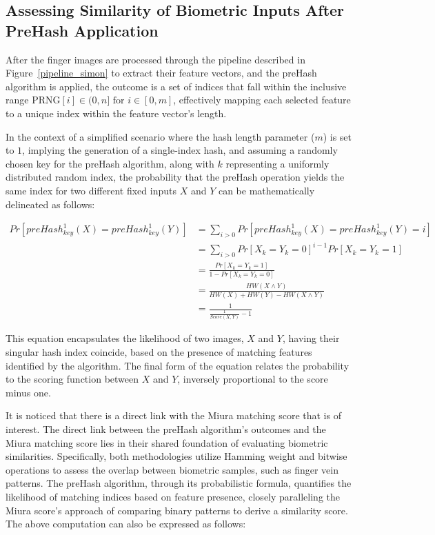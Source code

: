 \subsection{Assessing Similarity of Biometric Inputs After PreHash Application}
\label{sec:mu}

After the finger images are processed through the pipeline described in Figure~\ref{pipeline_simon} to extract their feature vectors, and the preHash algorithm is applied, the outcome is a set of indices that fall within the inclusive range \(\text{PRNG}[i] \in (0, n] \text{ for } i \in [0, m]\), effectively mapping each selected feature to a unique index within the feature vector's length.

In the context of a simplified scenario where the hash length parameter (\(m\)) is set to \(1\), implying the generation of a single-index hash, and assuming a randomly chosen key for the preHash algorithm, along with \(k\) representing a uniformly distributed random index, the probability that the preHash operation yields the same index for two different fixed inputs \(X\) and \(Y\) can be mathematically delineated as follows:


\begin{equation} \label{eq:preHash1}
    \begin{aligned}
        Pr[preHash_{key}^1(X) = preHash_{key}^1(Y)] &= \sum_{i > 0} Pr[preHash_{key}^1(X) = preHash_{key}^1(Y) = i]\\
        &= \sum_{i > 0} Pr[X_k = Y_k = 0]^{i - 1} Pr[X_k = Y_k = 1]\\
        &= \frac{Pr[X_k = Y_k = 1]}{1 - Pr[X_k = Y_k = 0]}\\
        &= \frac{HW(X \land Y)}{HW(X) + HW(Y) - HW(X \land Y)}\\
        &= \frac{1}{\frac{1}{Score(X, Y)} - 1}
    \end{aligned}
\end{equation}

This equation encapsulates the likelihood of two images, \(X\) and \(Y\), having their singular hash index coincide, based on the presence of matching features identified by the algorithm. The final form of the equation relates the probability to the scoring function between \(X\) and \(Y\), inversely proportional to the score minus one.

It is noticed that there is a direct link with the Miura matching score that is of interest. The direct link between the preHash algorithm's outcomes and the Miura matching score lies in their shared foundation of evaluating biometric similarities. Specifically, both methodologies utilize Hamming weight and bitwise operations to assess the overlap between biometric samples, such as finger vein patterns. The preHash algorithm, through its probabilistic formula, quantifies the likelihood of matching indices based on feature presence, closely paralleling the Miura score's approach of comparing binary patterns to derive a similarity score. The above computation can also be expressed as follows:

